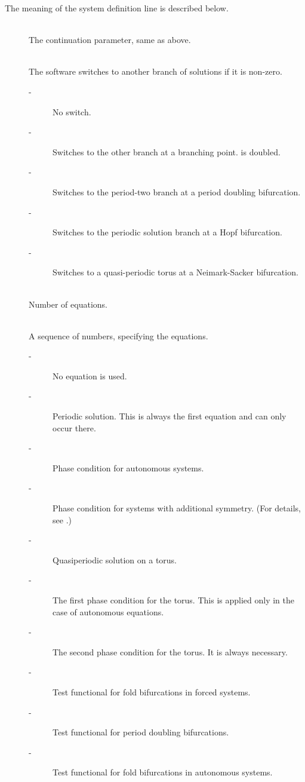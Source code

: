 \documentclass[10pt,a4paper]{ddedoc}
\begin{document}
The meaning of the system definition line is described below.
\begin{description}
\item[] ~\\
	The continuation parameter, same as above.
%
\item[] ~\\
	The software switches to another branch of solutions if it is non-zero.
\begin{description}
\item[ -] No switch.
\item[ -] Switches to the other branch at a branching point.  is doubled.
\item[ -] Switches to the period-two branch at a period doubling
bifurcation.
\item[ -] Switches to the periodic solution branch at a Hopf
bifurcation.
\item[ -] Switches to a quasi-periodic torus at a Neimark-Sacker
bifurcation.
\end{description}
\item[] ~\\
	Number of equations.
\item[] ~\\
	A sequence of numbers, specifying the equations.
\begin{description}
\item[ -] No equation is used.
\item[ -] Periodic solution. This is always the first equation and can
only occur there.
\item[ -] Phase condition for autonomous systems.
\item[ -] Phase condition for systems with additional symmetry. (For
details, see \cite{haegeman,roose-szalai}.)
\item[ -] Quasiperiodic solution on a torus.
\item[ -] The first phase condition for the torus. This is applied
only in the case of autonomous equations.
\item[ -] The second phase condition for the torus. It is always
necessary.
\item[ -] Test functional for fold bifurcations in forced systems.
\item[ -] Test functional for period doubling bifurcations.
\item[ -] Test functional for fold bifurcations in autonomous systems.

\end{description}
\end{description}
\end{document}

